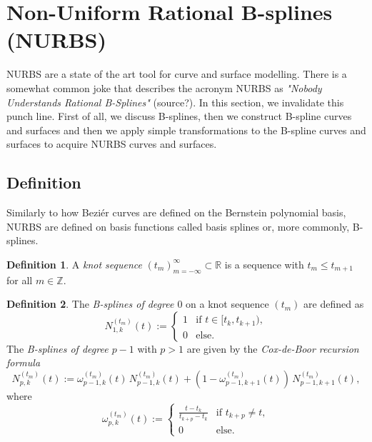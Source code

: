 \documentclass[a4paper, 11pt]{report}
\theoremstyle{definition}
\newtheorem{definition}{Definition}[section]
\renewcommand{\emph}[1]{\textit{#1}}
\begin{document}
\section{Non-Uniform Rational B-splines (NURBS)}
NURBS are a state of the art tool for curve and surface modelling. There is a somewhat common joke that describes the acronym NURBS as \emph{"Nobody Understands Rational B-Splines"} (source?). In this section, we invalidate this punch line. First of all, we discuss B-splines, then we construct B-spline curves and surfaces and then we apply simple transformations to the B-spline curves and surfaces to acquire NURBS curves and surfaces.

\subsection{Definition}
Similarly to how Beziér curves are defined on the Bernstein polynomial basis, NURBS are defined on basis functions called basis splines or, more commonly, B-splines.

\begin{definition}
	A \emph{knot sequence} $(t_m)_{m=-\infty}^{\infty} \subset \mathbb{R}$ is a sequence with $t_{m} \leq t_{m+1}$ for all $m \in \mathbb{Z}$.
\end{definition}

\begin{definition}
	The \emph{B-splines of degree $0$} on a knot sequence $(t_m)$ are defined as
	\begin{equation}
		N^{(t_m)}_{1,k}(t) :=
		\begin{cases}
			1 & \text{if } t \in [t_k, t_{k+1}),\\
			0 & \text{else.}
		\end{cases}
	\end{equation}
	The \emph{B-splines of degree $p-1$} with $p > 1$ are given by the \emph{Cox-de-Boor recursion formula}
	\begin{equation}\label{eq:coxdeboorrec}
		N_{p,k}^{(t_m)}(t) := \omega^{(t_m)}_{p-1, k}(t) \, N^{(t_m)}_{p-1, k}(t) + (1-\omega^{(t_m)}_{p-1, k+1}(t)) \, N^{(t_m)}_{p-1, k+1}(t),
	\end{equation}
	where
	\begin{equation}
		\omega^{(t_m)}_{p,k}(t) := 
		\begin{cases}
			\frac{t-t_k}{t_{k+p} - t_k} &\text{if } t_{k+p} \neq t,\\
			0 							&\text{else.}
		\end{cases}
	\end{equation}
\end{definition}
\end{document}
